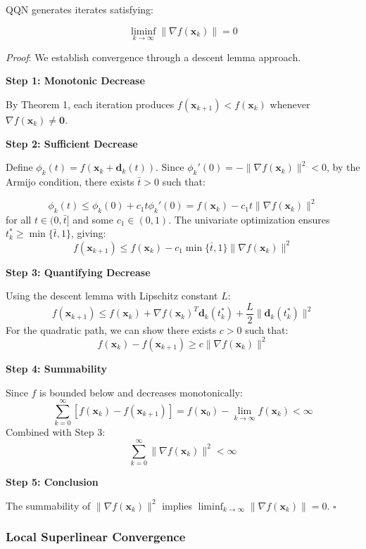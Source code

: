QQN generates iterates satisfying:

\[\liminf_{k \to \infty} \|\nabla f(\mathbf{x}_k)\| = 0\]

\emph{Proof}: We establish convergence through a descent lemma approach.

\textbf{Step 1: Monotonic Decrease}

By Theorem 1, each iteration produces \(f(\mathbf{x}_{k+1}) < f(\mathbf{x}_k)\) whenever \(\nabla f(\mathbf{x}_k) \neq \mathbf{0}\).

\textbf{Step 2: Sufficient Decrease}

Define \(\phi_k(t) = f(\mathbf{x}_k + \mathbf{d}_k(t))\). Since \(\phi_k'(0) = -\|\nabla f(\mathbf{x}_k)\|^2 < 0\), by the Armijo condition, there exists \(\bar{t} > 0\) such that:

\[\phi_k(t) \leq \phi_k(0) + c_1 t \phi_k'(0) = f(\mathbf{x}_k) - c_1 t \|\nabla f(\mathbf{x}_k)\|^2\]
for all \(t \in (0, \bar{t}]\) and some \(c_1 \in (0, 1)\).
The univariate optimization ensures \(t_k^* \geq \min\{\bar{t}, 1\}\), giving:
\[f(\mathbf{x}_{k+1}) \leq f(\mathbf{x}_k) - c_1 \min\{\bar{t}, 1\} \|\nabla f(\mathbf{x}_k)\|^2\]

\textbf{Step 3: Quantifying Decrease}

Using the descent lemma with Lipschitz constant \(L\):
\[f(\mathbf{x}_{k+1}) \leq f(\mathbf{x}_k) + \nabla f(\mathbf{x}_k)^T \mathbf{d}_k(t_k^*) + \frac{L}{2}\|\mathbf{d}_k(t_k^*)\|^2\]
For the quadratic path, we can show there exists \(c > 0\) such that:
\[f(\mathbf{x}_k) - f(\mathbf{x}_{k+1}) \geq c\|\nabla f(\mathbf{x}_k)\|^2\]

\textbf{Step 4: Summability}

Since \(f\) is bounded below and decreases monotonically:
\[\sum_{k=0}^{\infty} [f(\mathbf{x}_k) - f(\mathbf{x}_{k+1})] = f(\mathbf{x}_0) - \lim_{k \to \infty} f(\mathbf{x}_k) < \infty\]
Combined with Step 3:
\[\sum_{k=0}^{\infty} \|\nabla f(\mathbf{x}_k)\|^2 < \infty\]

\textbf{Step 5: Conclusion}

The summability of \(\|\nabla f(\mathbf{x}_k)\|^2\) implies \(\liminf_{k \to \infty} \|\nabla f(\mathbf{x}_k)\| = 0\). \(\square\)

\hypertarget{local-superlinear-convergence}{%
\subsubsection{Local Superlinear Convergence}\label{local-superlinear-convergence}}

